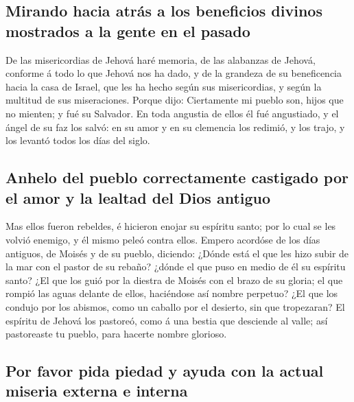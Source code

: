\hypertarget{mirando-hacia-atruxe1s-a-los-beneficios-divinos-mostrados-a-la-gente-en-el-pasado}{%
\subsection{Mirando hacia atrás a los beneficios divinos mostrados a la
gente en el
pasado}\label{mirando-hacia-atruxe1s-a-los-beneficios-divinos-mostrados-a-la-gente-en-el-pasado}}

 De las misericordias de Jehová haré memoria, de las
alabanzas de Jehová, conforme á todo lo que Jehová nos ha dado, y de la
grandeza de su beneficencia hacia la casa de Israel, que les ha hecho
según sus misericordias, y según la multitud de sus miseraciones.
 Porque dijo: Ciertamente mi pueblo son, hijos que no
mienten; y fué su Salvador.  En toda angustia de ellos él
fué angustiado, y el ángel de su faz los salvó: en su amor y en su
clemencia los redimió, y los trajo, y los levantó todos los días del
siglo.

\hypertarget{anhelo-del-pueblo-correctamente-castigado-por-el-amor-y-la-lealtad-del-dios-antiguo}{%
\subsection{Anhelo del pueblo correctamente castigado por el amor y la
lealtad del Dios
antiguo}\label{anhelo-del-pueblo-correctamente-castigado-por-el-amor-y-la-lealtad-del-dios-antiguo}}

 Mas ellos fueron rebeldes, é hicieron enojar su espíritu
santo; por lo cual se les volvió enemigo, y él mismo peleó contra ellos.
 Empero acordóse de los días antiguos, de Moisés y de su
pueblo, diciendo: ¿Dónde está el que les hizo subir de la mar con el
pastor de su rebaño? ¿dónde el que puso en medio de él su espíritu
santo?  ¿El que los guió por la diestra de Moisés con el
brazo de su gloria; el que rompió las aguas delante de ellos, haciéndose
así nombre perpetuo?  ¿El que los condujo por los abismos,
como un caballo por el desierto, sin que tropezaran?  El
espíritu de Jehová los pastoreó, como á una bestia que desciende al
valle; así pastoreaste tu pueblo, para hacerte nombre glorioso.

\hypertarget{por-favor-pida-piedad-y-ayuda-con-la-actual-miseria-externa-e-interna}{%
\subsection{Por favor pida piedad y ayuda con la actual miseria externa
e
interna}\label{por-favor-pida-piedad-y-ayuda-con-la-actual-miseria-externa-e-interna}}

